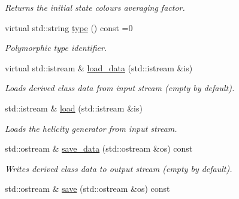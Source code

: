 \begin{DoxyCompactItemize}
\begin{DoxyCompactList}\small\item\em Returns the initial state colours averaging factor. \end{DoxyCompactList}\item 
\hypertarget{a00084_a3dca4a3cce4eab2b9848c65c1cf096b8}{virtual std\-::string \hyperlink{a00084_a3dca4a3cce4eab2b9848c65c1cf096b8}{type} () const =0}\label{a00084_a3dca4a3cce4eab2b9848c65c1cf096b8}

\begin{DoxyCompactList}\small\item\em Polymorphic type identifier. \end{DoxyCompactList}\item 
\hypertarget{a00084_a1306ccda27e704cf945a0bdc38873a04}{virtual std\-::istream \& \hyperlink{a00084_a1306ccda27e704cf945a0bdc38873a04}{load\-\_\-data} (std\-::istream \&is)}\label{a00084_a1306ccda27e704cf945a0bdc38873a04}

\begin{DoxyCompactList}\small\item\em Loads derived class data from input stream (empty by default). \end{DoxyCompactList}\item 
\hypertarget{a00084_ac59a5ccf6e21eade1d7ced25c3d624cd}{std\-::istream \& \hyperlink{a00084_ac59a5ccf6e21eade1d7ced25c3d624cd}{load} (std\-::istream \&is)}\label{a00084_ac59a5ccf6e21eade1d7ced25c3d624cd}

\begin{DoxyCompactList}\small\item\em Loads the helicity generator from input stream. \end{DoxyCompactList}\item 
\hypertarget{a00084_a95d3c72f80aab732b8dca88f92dbe4d1}{std\-::ostream \& \hyperlink{a00084_a95d3c72f80aab732b8dca88f92dbe4d1}{save\-\_\-data} (std\-::ostream \&os) const }\label{a00084_a95d3c72f80aab732b8dca88f92dbe4d1}

\begin{DoxyCompactList}\small\item\em Writes derived class data to output stream (empty by default). \end{DoxyCompactList}\item 
\hypertarget{a00084_ae87ed8ef1f6b0bea54616df6a9cad00f}{std\-::ostream \& \hyperlink{a00084_ae87ed8ef1f6b0bea54616df6a9cad00f}{save} (std\-::ostream \&os) const }\label{a00084_ae87ed8ef1f6b0bea54616df6a9cad00f}


\end{DoxyCompactItemize}
